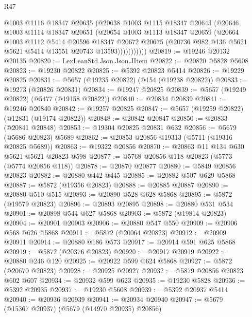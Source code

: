\begin{lexlean}{R47}
\begin{coremodule}
                @1003
                @1116
                @18347
                @20635
                (@20638
                  @1003
                  @1115
                  @18347
                  @20643
                  (@20646
                    @1003
                    @1114
                    @18347
                    @20651
                    (@20654
                      @1003
                      @1113
                      @18347
                      @20659
                      (@20664
                        @1003
                        @1112
                        @5414
                        @20596
                        @18347
                        @20672
                        @20675
                        (@20736 @982 @136 @5621 @5621 @5414 @13551 @20743 @13593)))))))))))
@20819 := @19246 @20132 @20135
@20820 := LexLeanStd.Json.Json.JItem
@20822 := @20820 @5828 @5608
@20823 := @19230 @20822
@20825 := @5392 @20823 @5414
@20826 := @19229 @20825
@20831 := @5657 (@19235 @20822) (@154 (@19238 @20822))
@20833 := @19273 (@20826 @20831)
@20834 := @19247 @20825
@20839 := @5657 (@19249 @20822) (@5477 (@19158 @20822))
@20840 := @20834 @20839
@20841 := @19246 @20840
@20842 := @19257 @20825
@20847 := @5657 (@19259 @20822) (@12831 (@19174 @20822))
@20848 := @20842 @20847
@20850 := @20833 (@20841 @20848)
@20853 := @19304 @20825 @20831 @632
@20856 := @5679 (@5686 @20823) @5689
@20862 := @20853 @20856 @19313 (@5711 (@19316 @20825 @5689))
@20863 := @19322 @20856
@20870 := @20863 @11 @134 @630 @5621 @5621 @20823 @598
@20877 := @5768 @20856 @118 @20823 (@5773 (@5774 @20856 @118))
@20878 := @20870 @20877
@20880 := @5849 @20856 @20823
@20882 := @20880 @442 @445
@20885 := @20882 @507 @629 @5868
@20887 := @5872 (@19356 @20823)
@20888 := @20885 @20887
@20890 := @20880 @510 @515
@20893 := @20890 @528 @628 @5868
@20895 := @5872 (@19579 @20823)
@20896 := @20893 @20895
@20898 := @20880 @531 @534
@20901 := @20898 @544 @627 @5868
@20903 := @5872 (@19814 @20823)
@20904 := @20901 @20903
@20906 := @20880 @547 @550
@20909 := @20906 @568 @626 @5868
@20911 := @5872 (@20064 @20823)
@20912 := @20909 @20911
@20914 := @20880 @186 @573
@20917 := @20914 @591 @625 @5868
@20919 := @5872 (@20376 @20823)
@20920 := @20917 @20919
@20922 := @20880 @246 @120
@20925 := @20922 @599 @624 @5868
@20927 := @5872 (@20670 @20823)
@20928 := @20925 @20927
@20932 := @5879 @20856 @20823 @602 @607
@20934 := @20932 @599 @623
@20935 := @19230 @5828
@20936 := @5392 @20935
@20937 := @19230 @5608
@20939 := @5392 @20937 @5414
@20940 := @20936 @20939
@20941 := @20934 @20940
@20947 := @5679 (@15367 @20937) (@5679 (@14970 @20935) @20856)

\end{coremodule}
\end{lexlean}
